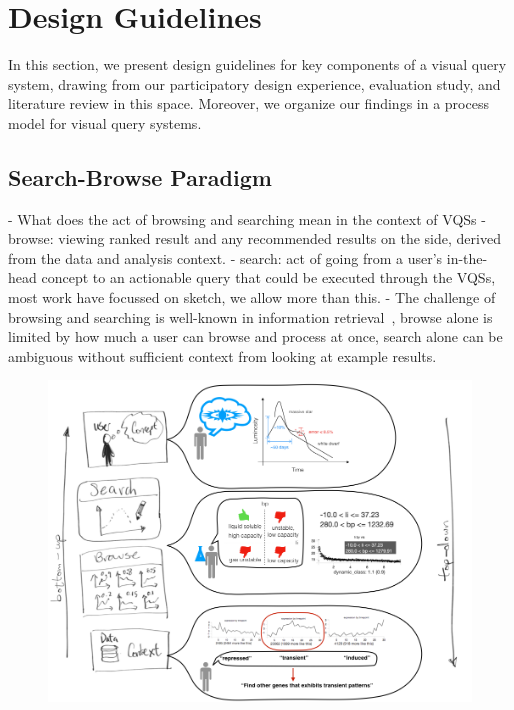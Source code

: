 \section{Design Guidelines\label{sec:guidelines}}
In this section, we present design guidelines for key components of a visual query system, drawing from our participatory design experience, evaluation study, and literature review in this space. Moreover, we organize our findings in a process model for visual query systems. %
\subsection{Search-Browse Paradigm}
- What does the act of browsing and searching mean in the context of VQSs
  - browse: viewing ranked result and any recommended results on the side, derived from the data and analysis context.
  - search: act of going from a user's in-the-head concept to an actionable query that could be executed through the VQSs, most work have focussed on sketch, we allow more than this.
  - The challenge of browsing and searching is well-known in information retrieval~\cite{Olston2003}, browse alone is limited by how much a user can browse and process at once, search alone can be ambiguous without sufficient context from looking at example results.
\begin{figure}[h!]
    \centering
    \includegraphics[width=\columnwidth]{figures/search-browse-model.png}
    \vspace{-6pt}\caption{}
    \label{sbmodel}
    \vspace{-5pt}
\end{figure}

